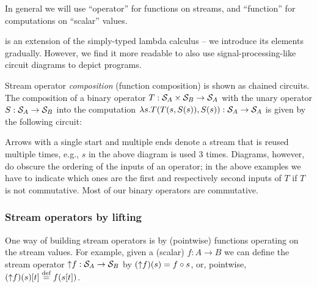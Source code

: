 In general we will use ``operator'' for functions on streams, and
``function'' for computations on ``scalar'' values.

\dbsp is an extension of the simply-typed lambda calculus -- we
introduce its elements gradually.  However, we find it more readable
to also use signal-processing-like circuit diagrams to depict \dbsp
programs.

Stream operator \emph{composition} (function composition) is shown as chained circuits.
The composition of a binary operator $T: \mathcal{S}_{A} \times \mathcal{S}_{B} \to \mathcal{S}_{A}$ with the
unary operator $S: \mathcal{S}_{A} \to \mathcal{S}_{B}$ into the computation
$\lambda s. T(T(s,S(s)),S(s)) : \mathcal{S}_{A}\to\mathcal{S}_{A}$
is given by the following circuit:

\begin{center}
\end{center}

Arrows with a single start and multiple
ends denote a stream that is reused multiple times, e.g., $s$
in the above diagram is used 3 times.  Diagrams, however, do obscure the
ordering of the inputs of an operator; in the above examples
we have to indicate which ones are the first and respectively second inputs of $T$
if $T$ is not commutative.  Most of our binary operators are commutative.

\subsubsection{Stream operators by lifting}\label{sec:lifting}

One way of building stream operators is by (pointwise) 
functions operating on the stream values. For example, given a (scalar)
$f: A \to B$ we can define the stream operator
${\uparrow}f :\mathcal{S}_{A} \to \mathcal{S}_{B}$ by $({\uparrow}f)(s)=f \circ s$,
or, pointwise, $({\uparrow}f)(s)[t] \stackrel{\textrm{\scriptsize def}}{=} f(s[t])$.

